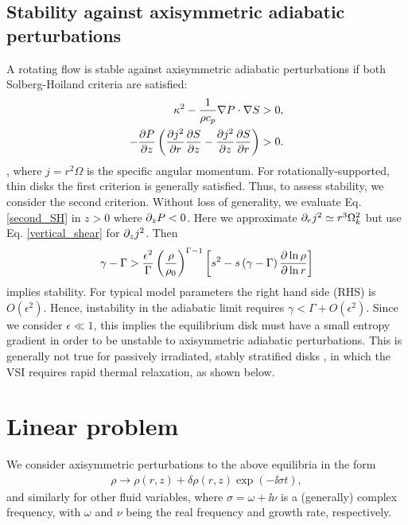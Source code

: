 \subsection{Stability against axisymmetric adiabatic
  perturbations}\label{solberg}
A rotating flow is stable against axisymmetric adiabatic perturbations
if both Solberg-Hoiland criteria  are satisfied:
\begin{align}
  \kappa^2 - \frac{1}{\rho c_p}\nabla P \cdot \nabla S &> 0,\\
  -\frac{\partial P}{\partial z}\left(\frac{\partial j^2}{\partial r}\frac{\partial S}{ \partial z} -
    \frac{\partial j^2}{\partial z}\frac{\partial S}{\partial r} \right)&>0. \label{second_SH} 
\end{align}
\citep{tassoul78}, where $j=r^2\Omega$ is the specific angular
momentum. For rotationally-supported, thin disks %
the first criterion is generally satisfied. 
Thus, to assess stability, we consider the second
criterion. 
Without loss of generality, we evaluate Eq. \ref{second_SH} in $z>0$
where $\partial_zP<0$. Here we approximate $\partial_r j^2\simeq r^3\Omega_k^2$ but
use Eq. \ref{vertical_shear} for $\partial_zj^2$. Then 
\begin{align}\label{solberg2}
  \gamma - \Gamma > \frac{\epsilon^2}{\Gamma}
  \left(\frac{\rho}{\rho_0}\right)^{\Gamma-1} \left[s^2
    -s\left(\gamma-\Gamma\right)\frac{\partial\ln{\rho}}{\partial\ln{r}} \right]
\end{align} 
implies stability. For typical model parameters the right hand
side (RHS) is $O(\epsilon^2)$. Hence, instability in the adiabatic limit  
requires $\gamma < \Gamma + O(\epsilon^2)$. Since we consider
$\epsilon\ll1$, this implies the equilibrium disk must have a small
entropy gradient in order to be unstable to axisymmetric adiabatic
perturbations. This is generally not true for passively irradiated, stably
stratified disks \citep{chiang97}, in which the VSI requires rapid
thermal relaxation, as shown below. 

\section{Linear problem}\label{linear}
We consider axisymmetric perturbations to the above equilibria in the
form 
\begin{align}
  \rho \to \rho(r, z) + \delta\rho(r,z)\exp{\left( - \ii\sigma
      t\right)},    
\end{align}
and similarly for other fluid variables, where $\sigma = \omega + \ii
\nu$ is a (generally) complex frequency, with $\omega$ and $\nu$ being
the real frequency and growth rate, respectively.

